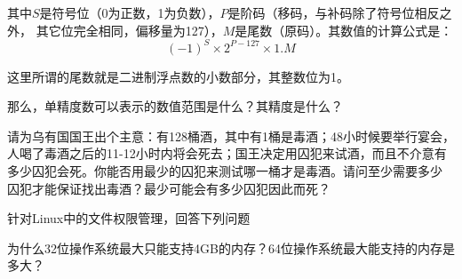 \documentclass[addpoints,12pt,answers]{exam}
\begin{document}
\begin{CJK*}{UTF8}{gbsn}
\begin{questions}
其中$S$是符号位（0为正数，1为负数），$P$是阶码（移码，与补码除了符号位相反之外，
其它位完全相同，偏移量为127），$M$是尾数（原码）。其数值的计算公式是：
$$
(-1)^{S} \times 2^{P-127} \times 1.M
$$

这里所谓的尾数就是二进制浮点数的小数部分，其整数位为1。

那么，单精度数可以表示的数值范围是什么？其精度是什么？

\begin{solution}
\vspace{2in}

\end{solution}


\question[10]
请为乌有国国王出个主意：有128桶酒，其中有1桶是毒酒；48小时候要举行宴会，
人喝了毒酒之后的11-12小时内将会死去；国王决定用囚犯来试酒，而且不介意有
多少囚犯会死。你能否用最少的囚犯来测试哪一桶才是毒酒。请问至少需要多少
囚犯才能保证找出毒酒？最少可能会有多少囚犯因此而死？

\begin{solution}
\vspace{1in}
\end{solution}


\question
针对Linux中的文件权限管理，回答下列问题

\question[10]
为什么32位操作系统最大只能支持4GB的内存？64位操作系统最大能支持的内存是多大？
\begin{solution}
\vspace{1in}
\end{solution}



\end{questions}
\end{CJK*}
\end{document}
